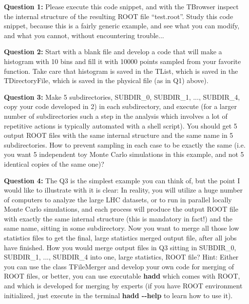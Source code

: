 \documentclass[11pt]{article}
\begin{document}
\noindent\textbf{Question 1:} Please execute this code snippet, and with the TBrowser inspect the internal structure of the resulting ROOT file ``test.root''. Study this code snippet, because this is a fairly generic example, and see what you can modify, and what you cannot, without encountering trouble...

\vspace{0.144cm}

\noindent\textbf{Question 2:} Start with a blank file and develop a code that will make a histogram with 10 bins and fill it with 10000 points sampled from your favorite function. Take care that histogram is saved in the TList, which is saved in the TDirectoryFile, which is saved in the physical file (as in Q1) above).

\vspace{0.144cm}

\noindent\textbf{Question 3:} Make 5 subdirectories, SUBDIR\_0,  SUBDIR\_1, ...,  SUBDIR\_4, copy your code developed in 2) in each subdirectory, and execute (for a larger number of subdirectories such a step in the analysis which involves a lot of repetitive actions is typically automated with a shell script). You should get 5 output ROOT files with the same internal structure and the same name in 5 subdirectories. How to prevent sampling in each case to be exactly the same (i.e. you want 5 independent toy Monte Carlo simulations in this example, and not 5 identical copies of the same one)?

\vspace{0.144cm}

\noindent\textbf{Question 4:} The Q3 is the simplest example you can think of, but the point I would like to illustrate with it is clear: In reality, you will utilize a huge number of computers to analyze the large LHC datasets, or to run in parallel locally Monte Carlo simulations, and each process will produce the output ROOT file with exactly the same internal structure (this is mandatory in fact!) and the same name, sitting in some subdirectory. Now you want to merge all those low statistics files to get the final, large statistics merged output file, after all jobs have finished. How you would merge output files in Q3 sitting in SUBDIR\_0, SUBDIR\_1, ...,  SUBDIR\_4 into one, large statistics, ROOT file? Hint: Either you can use the class TFileMerger and develop your own code for merging of ROOT files, or better, you can use executable {\bf hadd} which comes with ROOT, and which is developed for merging by experts (if you have ROOT environment initialized, just execute in the terminal {\bf hadd \--\--help} to learn how to use it).    
\end{document}
